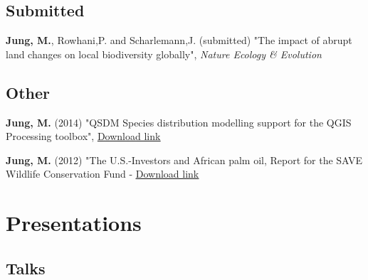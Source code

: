 \documentclass[12pt,a4paper,serif]{moderncv}        %
\begin{document}
\vspace{8pt}

\subsection{Submitted}
\vspace{2pt}
\begin{bibenum}

 \item[] \textbf{Jung, M.}, Rowhani,P. and Scharlemann,J. (submitted) "The impact of abrupt land changes on local biodiversity globally", \emph{Nature Ecology \& Evolution}

\end{bibenum}

\vspace{8pt}
\subsection{Other}
\vspace{2pt}
\begin{bibenum}

  \item[] \textbf{Jung, M.} (2014) "QSDM Species distribution modelling support for the QGIS Processing toolbox", \href{http://plugins.qgis.org/plugins/QSDM/}{\underline{Download link}}
  
  \item[] \textbf{Jung, M.} (2012) "The U.S.-Investors and African palm oil, Report for the SAVE Wildlife Conservation Fund - \href{https://save-wildlife.org/fileadmin/documents/Regenwaldschutz/Kamerun/us_investors_and_african_palm_oil.pdf}{\underline{Download link}}

\end{bibenum}


\section{Presentations}

\subsection{Talks}
\vspace{6pt}
\end{document}
